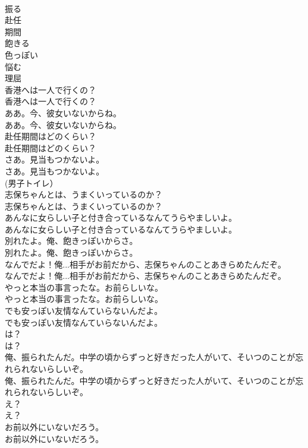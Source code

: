 \documentclass[8pt]{extreport}
\begin{document}
\begin{CJK}{UTF8}{min}
\\	振る
\\	赴任
\\	期間
\\	飽きる
\\	色っぽい
\\	悩む
\\	理屈
\\	香港へは一人で行くの？	
\\	香港へは一人で行くの？ 
\\	ああ。今、彼女いないからね。	
\\	ああ。今、彼女いないからね。 
\\	赴任期間はどのくらい？	
\\	赴任期間はどのくらい？ 
\\	さあ。見当もつかないよ。	
\\	さあ。見当もつかないよ。 
\\	(男子トイレ） 
\\	志保ちゃんとは、うまくいっているのか？	
\\	志保ちゃんとは、うまくいっているのか？ 
\\	あんなに女らしい子と付き合っているなんてうらやましいよ。	
\\	あんなに女らしい子と付き合っているなんてうらやましいよ。 
\\	別れたよ。俺、飽きっぽいからさ。	
\\	別れたよ。俺、飽きっぽいからさ。 
\\	なんでだよ！俺...相手がお前だから、志保ちゃんのことあきらめたんだぞ。	
\\	なんでだよ！俺...相手がお前だから、志保ちゃんのことあきらめたんだぞ。 
\\	やっと本当の事言ったな。お前らしいな。	
\\	やっと本当の事言ったな。お前らしいな。 
\\	でも安っぽい友情なんていらないんだよ。	
\\	でも安っぽい友情なんていらないんだよ。 
\\	は？	
\\	は？ 
\\	俺、振られたんだ。中学の頃からずっと好きだった人がいて、そいつのことが忘れられないらしいぞ。	
\\	俺、振られたんだ。中学の頃からずっと好きだった人がいて、そいつのことが忘れられないらしいぞ。 
\\	え？	
\\	え？ 
\\	お前以外にいないだろう。	
\\	お前以外にいないだろう。 

\end{CJK}
\end{document}
